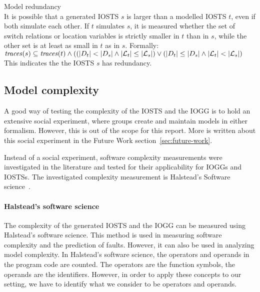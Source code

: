 \begin{definition}\label{def:redundancy} Model redundancy\\
It is possible that a generated IOSTS $s$ is larger than a modelled IOSTS $t$, even if both simulate each other. If $t$ simulates $s$, it is measured whether the set of switch relations or location variables is strictly smaller in $t$ than in $s$, while the other set is at least as small in $t$ as in $s$. Formally:
\vspace{5px} \\
$\mathit{traces}(s) \subseteq \mathit{traces}(t) \land ((|D_t| < |D_s| \land |\mathcal{L}_t| \leq |\mathcal{L}_s|) \lor (|D_t| \leq |D_s| \land |\mathcal{L}_t| < |\mathcal{L}_s|)$
\vspace{5px} \\
This indicates the the IOSTS $s$ has redundancy.
\end{definition}

\subsection{Model complexity}\label{sec:complexity_measurement}
A good way of testing the complexity of the IOSTS and the IOGG is to hold an extensive social experiment, where groups create and maintain models in either formalism. However, this is out of the scope for this report. More is written about this social experiment in the Future Work section~\ref{sec:future-work}.

Instead of a social experiment, software complexity measurements were investigated in the literature and tested for their applicability for IOGGs and IOSTSs. The investigated complexity measurement is Halstead's Software science~\cite{Halstead:software-science}.
\begin{comment}
\begin{enumerate}
\item Halstead's software science
\item Cyclomatic complexity
\item System complexity
\end{enumerate}
\end{comment}

\paragraph*{Halstead's software science} The complexity of the generated IOSTS and the IOGG can be measured using Halstead's software science. This method is used in measuring software complexity and the prediction of faults. However, it can also be used in analyzing model complexity. In Halstead's software science, the operators and operands in the program code are counted. The operators are the function symbols, the operands are the identifiers. However, in order to apply these concepts to our setting, we have to identify what we consider to be operators and operands.

